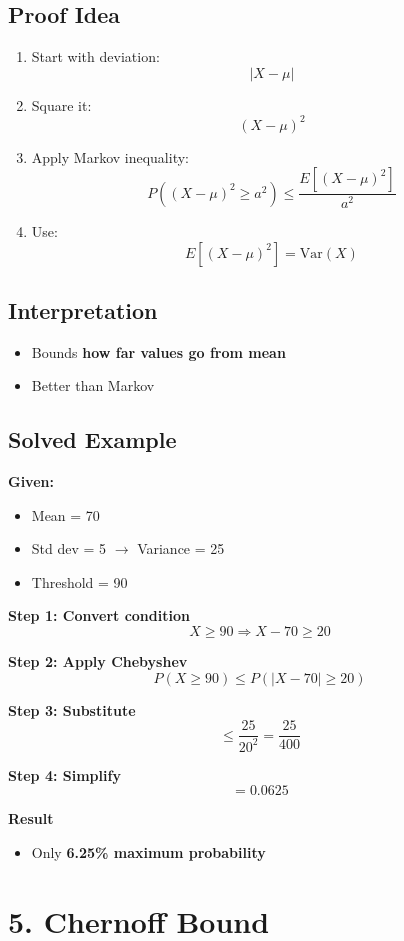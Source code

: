 \documentclass[11pt]{article}
\begin{document}
\subsection*{Proof Idea}
\begin{enumerate}
\item Start with deviation:
\[
|X - \mu|
\]
\item Square it:
\[
(X - \mu)^2
\]
\item Apply Markov inequality:
\[
P((X-\mu)^2 \ge a^2)
\le \frac{E[(X-\mu)^2]}{a^2}
\]
\item Use:
\[
E[(X-\mu)^2] = \text{Var}(X)
\]
\end{enumerate}

\subsection*{Interpretation}
\begin{itemize}
\item Bounds \textbf{how far values go from mean}
\item Better than Markov
\end{itemize}

\subsection*{Solved Example}

\textbf{Given:}
\begin{itemize}
\item Mean = 70
\item Std dev = 5 $\rightarrow$ Variance = 25
\item Threshold = 90
\end{itemize}

\textbf{Step 1: Convert condition}
\[
X \ge 90 \Rightarrow X - 70 \ge 20
\]

\textbf{Step 2: Apply Chebyshev}
\[
P(X \ge 90) \le P(|X - 70| \ge 20)
\]

\textbf{Step 3: Substitute}
\[
\le \frac{25}{20^2} = \frac{25}{400}
\]

\textbf{Step 4: Simplify}
\[
= 0.0625
\]

\textbf{Result}
\begin{itemize}
\item Only \textbf{6.25\% maximum probability}
\end{itemize}

\section*{5. Chernoff Bound}
\end{document}
